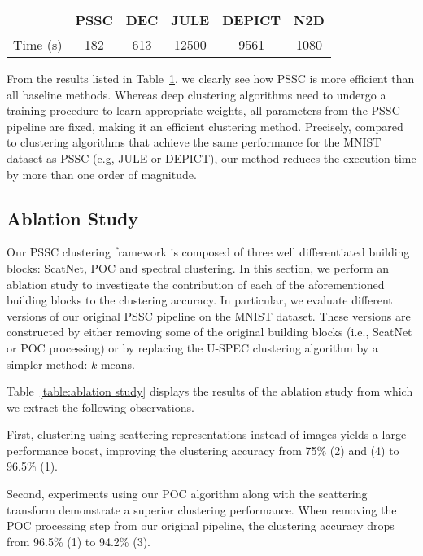 \documentclass[11pt]{article}
\theoremstyle{definition}
\newcommand{\Table}[1]{Table~\ref{#1}}
\begin{document}
\begin{table}[h]
	\centering
	\label{table:time comparison}
\begin{tabular}{|l|ccccc|}
		\hline
		& PSSC & DEC & JULE & DEPICT & N2D \\
		\hline
		Time (s) & 182  & 613 & 12500 & 9561 & 1080 \\
		\hline
	\end{tabular}
\end{table}

From the results listed in \Table{table:time comparison}, we clearly see how PSSC is more efficient than all baseline methods. 
Whereas deep clustering algorithms need to undergo a training procedure to learn appropriate weights, all parameters from the PSSC pipeline are fixed, making it an efficient clustering method. Precisely, compared to clustering algorithms that achieve the same performance for the MNIST dataset as PSSC (e.g, JULE or DEPICT), our method reduces the execution time by more than one order of magnitude.


\subsection{Ablation Study}

Our PSSC clustering framework is composed of three well differentiated building blocks: ScatNet, POC and spectral clustering. In this section, we perform an ablation study to investigate the contribution of each of the aforementioned building blocks to the clustering accuracy. In particular, we evaluate different versions of our original PSSC pipeline on the MNIST dataset. These versions are constructed by either removing some of the original building blocks (i.e., ScatNet or POC processing) or by replacing the U-SPEC clustering algorithm by a simpler method: $k$-means.

\Table{table:ablation study} displays the results of the ablation study from which we extract the following observations.

First, clustering using scattering representations instead of images yields a large performance boost, improving the clustering accuracy from 75\% (2) and (4) to 96.5\% (1). 

Second, experiments using our POC algorithm along with the scattering transform demonstrate a superior clustering performance. When removing the POC processing step from our original pipeline, the clustering accuracy drops from 96.5\% (1) to 94.2\% (3). 
\end{document}
